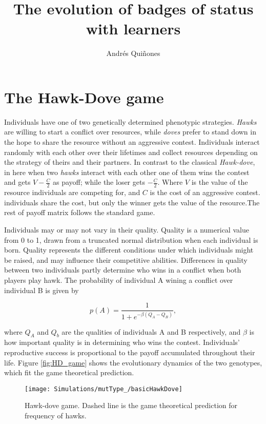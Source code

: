 \documentclass[]{article}
\title{The evolution of badges of status with learners}
\author{Andrés Quiñones}
\date{}
\begin{document}
\maketitle

\section{The Hawk-Dove game}\label{the-hawk-dove-game}

Individuals have one of two genetically determined phenotypic
strategies. \emph{Hawks} are willing to start a conflict over resources,
while \emph{doves} prefer to stand down in the hope to share the
resource without an aggressive contest. Individuals interact randomly
with each other over their lifetimes and collect resources depending on
the strategy of theirs and their partners. In contrast to the classical
\emph{Hawk-dove}, in here when two \emph{hawks} interact with each other
one of them wins the contest and gets \(V-\frac{C}{2}\) as payoff; while
the loser gets \(-\frac{C}{2}\). Where \(V\) is the value of the
resource individuals are competing for, and \(C\) is the cost of an
aggressive contest. individuals share the cost, but only the winner gets
the value of the resource.The rest of payoff matrix follows the standard
game.

Individuals may or may not vary in their quality. Quality is a numerical
value from 0 to 1, drawn from a truncated normal distribution when each
individual is born. Quality represents the different conditions under
which individuals might be raised, and may influence their competitive
abilities. Differences in quality between two individuals partly
determine who wins in a conflict when both players play hawk. The
probability of individual A wining a conflict over individual B is given
by

\begin{equation}
p(A)=\frac{1}{1+e^{-\beta(Q_A-Q_B)}},
\end{equation}

where \(Q_A\) and \(Q_b\) are the qualities of individuals A and B
respectively, and \(\beta\) is how important quality is in determining
who wins the contest. Individuals' reproductive success is proportional
to the payoff accumulated throughout their life. Figure
\ref{fig:HD_game} shows the evolutionary dynamics of the two genotypes,
which fit the game theoretical prediction.

\begin{figure}
\texttt{[image: Simulations/mutType\_/basicHawkDove]} \caption{\label{fig:HD_game}Hawk-dove game. Dashed line is the  game theoretical prediction for frequency of hawks.}\label{fig:fig1}
\end{figure}
\end{document}

